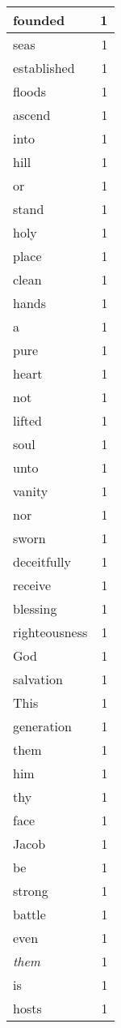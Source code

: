 \begin{center}
\begin{longtable}{l|r}
founded & 1 \\ \hline
seas & 1 \\ \hline
established & 1 \\ \hline
floods & 1 \\ \hline
ascend & 1 \\ \hline
into & 1 \\ \hline
hill & 1 \\ \hline
or & 1 \\ \hline
stand & 1 \\ \hline
holy & 1 \\ \hline
place & 1 \\ \hline
clean & 1 \\ \hline
hands & 1 \\ \hline
a & 1 \\ \hline
pure & 1 \\ \hline
heart & 1 \\ \hline
not & 1 \\ \hline
lifted & 1 \\ \hline
soul & 1 \\ \hline
unto & 1 \\ \hline
vanity & 1 \\ \hline
nor & 1 \\ \hline
sworn & 1 \\ \hline
deceitfully & 1 \\ \hline
receive & 1 \\ \hline
blessing & 1 \\ \hline
righteousness & 1 \\ \hline
God & 1 \\ \hline
salvation & 1 \\ \hline
This & 1 \\ \hline
generation & 1 \\ \hline
them & 1 \\ \hline
him & 1 \\ \hline
thy & 1 \\ \hline
face & 1 \\ \hline
Jacob & 1 \\ \hline
be & 1 \\ \hline
strong & 1 \\ \hline
battle & 1 \\ \hline
even & 1 \\ \hline
\emph{them} & 1 \\ \hline
is & 1 \\ \hline
hosts & 1 \\ \hline
\end{longtable}
\end{center}



